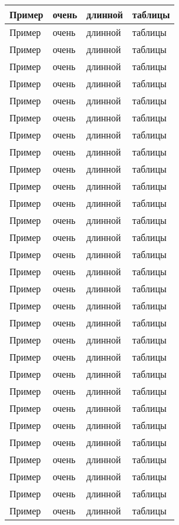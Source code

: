 \documentclass[12pt, twoside, final]{ruost}
\begin{document}
\begin{OST}
\begin{longtabu}{|X[l]|X[c]|X[c]|X[r]|}
						Пример & очень & длинной & таблицы \\ \hline
						Пример & очень & длинной & таблицы \\ \hline
						Пример & очень & длинной & таблицы \\ \hline
						Пример & очень & длинной & таблицы \\ \hline
						Пример & очень & длинной & таблицы \\ \hline
						
						Пример & очень & длинной & таблицы \\ \hline
						Пример & очень & длинной & таблицы \\ \hline
						Пример & очень & длинной & таблицы \\ \hline
						Пример & очень & длинной & таблицы \\ \hline
						Пример & очень & длинной & таблицы \\ \hline
						
						Пример & очень & длинной & таблицы \\ \hline
						Пример & очень & длинной & таблицы \\ \hline
						Пример & очень & длинной & таблицы \\ \hline
						Пример & очень & длинной & таблицы \\ \hline
						Пример & очень & длинной & таблицы \\ \hline
						
						Пример & очень & длинной & таблицы \\ \hline
						Пример & очень & длинной & таблицы \\ \hline
						Пример & очень & длинной & таблицы \\ \hline
						Пример & очень & длинной & таблицы \\ \hline
						Пример & очень & длинной & таблицы \\ \hline
						
						Пример & очень & длинной & таблицы \\ \hline
						Пример & очень & длинной & таблицы \\ \hline
						Пример & очень & длинной & таблицы \\ \hline
						Пример & очень & длинной & таблицы \\ \hline
						Пример & очень & длинной & таблицы \\ \hline
						
						Пример & очень & длинной & таблицы \\ \hline
						Пример & очень & длинной & таблицы \\ \hline
						Пример & очень & длинной & таблицы \\ \hline
						Пример & очень & длинной & таблицы \\ \hline
						Пример & очень & длинной & таблицы \\ \hline
						

\end{longtabu}
\end{OST}
\end{document}
